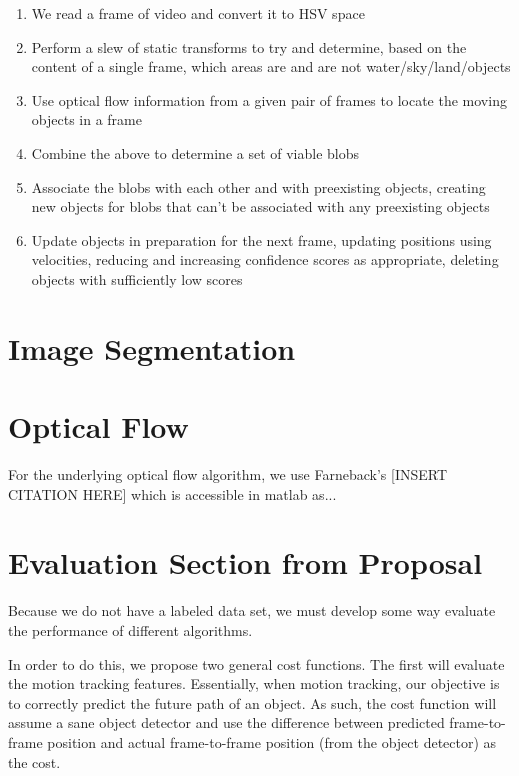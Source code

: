 \documentclass{article}
\begin{document}
\begin{enumerate}
\item We read a frame of video and convert it to HSV space
\item Perform a slew of static transforms to try and determine,
      based on the content of a single frame, which areas are and
      are not water/sky/land/objects
\item Use optical flow information from a given pair of frames to
      locate the moving objects in a frame
\item Combine the above to determine a set of viable blobs
\item Associate the blobs with each other and with preexisting objects,
      creating new objects for blobs that can't be associated with any
      preexisting objects
\item Update objects in preparation for the next frame, updating
      positions using velocities, reducing and increasing confidence
      scores as appropriate, deleting objects with sufficiently low
      scores
\end{enumerate}

\section{Image Segmentation}

\section{Optical Flow}

For the underlying optical flow algorithm, we use Farneback's
[INSERT CITATION HERE] which is accessible in matlab as...

\section{Evaluation Section from Proposal}

Because we do not have a labeled data set, we must develop
some way evaluate the performance of different algorithms.

In order to do this, we propose two general cost functions.
The first will evaluate the motion tracking features.
Essentially, when motion tracking, our objective is to
correctly predict the future path of an object. As such,
the cost function will assume a sane object detector and
use the difference between predicted frame-to-frame position
and actual frame-to-frame position (from the object detector)
as the cost.
\end{document}
